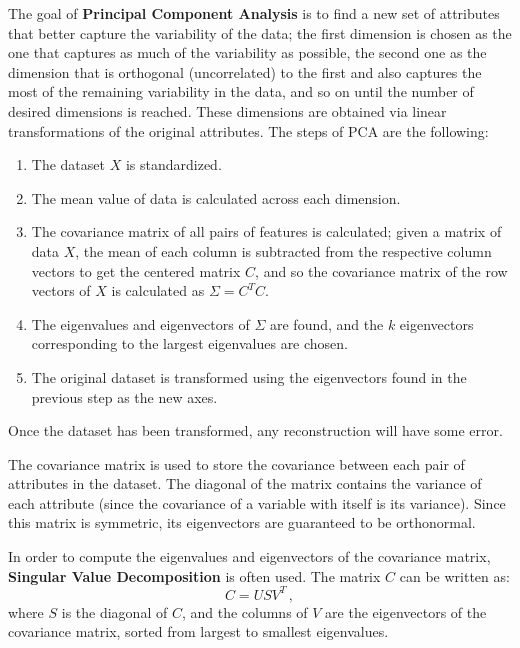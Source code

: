The goal of \textbf{Principal Component Analysis} is to find a new set of attributes that better capture the variability of the data; the first dimension is chosen as the one that captures as much of the variability as possible, the second one as the dimension that is orthogonal (uncorrelated) to the first and also captures the most of the remaining variability in the data, and so on until the number of desired dimensions is reached. These dimensions are obtained via linear transformations of the original attributes. The steps of PCA are the following:
\begin{enumerate}
    \item The dataset $X$ is standardized.
    
    \item The mean value of data is calculated across each dimension.
    
    \item The covariance matrix of all pairs of features is calculated; given a matrix of data $X$, the mean of each column is subtracted from the respective column vectors to get the centered matrix $C$, and so the covariance matrix of the row vectors of $X$ is calculated as $\Sigma = C^TC$.
    
    \item The eigenvalues and eigenvectors of $\Sigma$ are found, and the $k$ eigenvectors corresponding to the largest eigenvalues are chosen.
    
    \item The original dataset is transformed using the eigenvectors found in the previous step as the new axes.
\end{enumerate}
Once the dataset has been transformed, any reconstruction will have some error.

The covariance matrix is used to store the covariance between each pair of attributes in the dataset. The diagonal of the matrix contains the variance of each attribute (since the covariance of a variable with itself is its variance). Since this matrix is symmetric, its eigenvectors are guaranteed to be orthonormal.

In order to compute the eigenvalues and eigenvectors of the covariance matrix, \textbf{Singular Value Decomposition} is often used. The matrix $C$ can be written as:
\begin{equation*}
    C = U S V^T \,,
\end{equation*}
where $S$ is the diagonal of $C$, and the columns of $V$ are the eigenvectors of the covariance matrix, sorted from largest to smallest eigenvalues.

